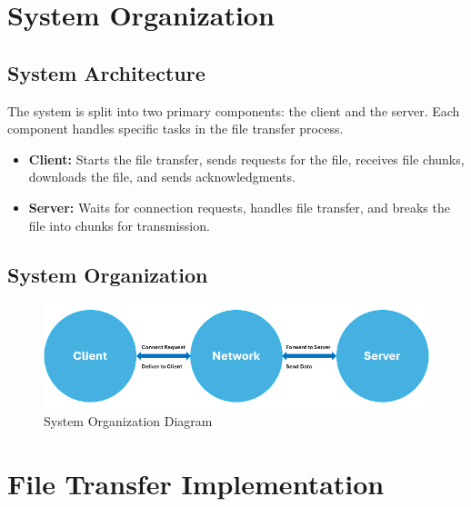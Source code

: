 \documentclass[a4paper,12pt]{article}
\begin{document}
\maketitle 

\newpage
\section{System Organization}
\subsection{System Architecture}
The system is split into two primary components: the client and the server. Each component handles specific tasks in the file transfer process.

\begin{itemize}
    \item \textbf{Client:} Starts the file transfer, sends requests for the file, receives file chunks, downloads the file, and sends acknowledgments.
    \item \textbf{Server:} Waits for connection requests, handles file transfer, and breaks the file into chunks for transmission. 
\end{itemize}

\subsection{System Organization}
\vspace{1em}  

\begin{figure}[ht!]
    \centering
    \includegraphics[width=1\textwidth]{2.png}
    \caption{System Organization Diagram}
    \label{fig:system_organization}
\end{figure}


\maketitle  

\newpage
\section{File Transfer Implementation}
\end{document}
